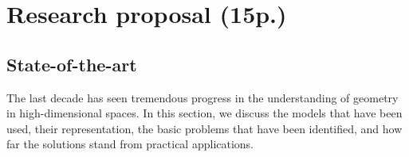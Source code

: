 \section{Research proposal (15p.)}

\subsection{State-of-the-art}%


The last decade has seen tremendous progress in the understanding of geometry in high-dimensional spaces. In this section, we discuss the models that have been used, their representation, the basic problems that have been identified, and how far the solutions stand from practical applications.



